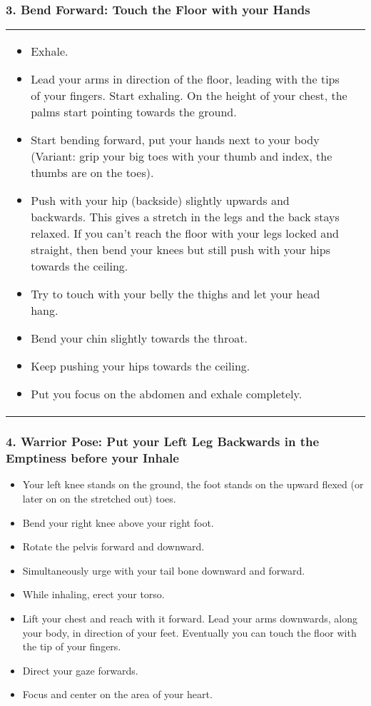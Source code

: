 \documentclass[../Book.Stress_regulation.tex]{subfiles}
\begin{document}
\subsubsection{3. Bend Forward: Touch the Floor with your Hands}


\begin{tabular}{p{9.7cm} p{1.8cm}}

\begin{itemize}
\item Exhale.
\item Lead your arms in direction of the floor, leading with the tips of your fingers. Start exhaling.
  On the height of your chest, the palms start pointing towards the ground. 
\item Start bending forward, put your hands next to your body (Variant: grip your big toes with your thumb  and index, the thumbs are on the toes).
\item Push with your hip (backside) slightly upwards and backwards. This gives a stretch in the legs and the back stays relaxed.
  If you can't reach the floor with your legs locked and straight, then bend your knees but still push with your hips towards the ceiling.
\item Try to touch with your belly the thighs and let your head hang.
\item Bend your chin slightly towards the throat.
\item Keep pushing your hips towards the ceiling.
\item Put you focus on the abdomen and exhale completely.  
\end{itemize}
    &
    \raisebox{-1.2\totalheight}{\texttt{[image: SS\_ForwardBend]}}
  
  \end{tabular}


\subsubsection{4. Warrior Pose: Put your Left Leg Backwards in the Emptiness before your Inhale}
\begin{itemize}
\item Your left knee stands on the ground, the foot stands on the upward flexed (or later on on the stretched out) toes.
\item Bend your right knee above your right foot.
\item Rotate the pelvis forward and downward.
\item Simultaneously urge with your tail bone downward and forward.
\item While inhaling, erect your torso.
\item Lift your chest and reach with it forward. Lead your arms downwards, along your body, in direction of your feet.
  Eventually you can touch the floor with the tip of your fingers.
\item Direct your gaze forwards.
\item Focus and center on the area of your heart.    
\end{itemize}
\end{document}
